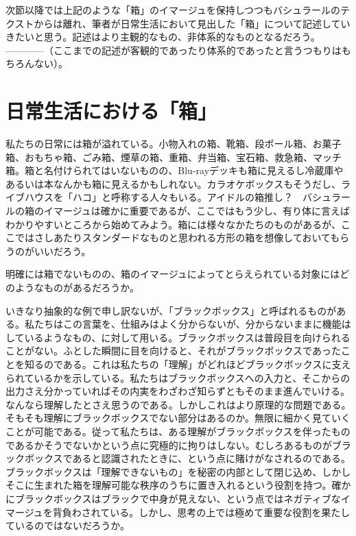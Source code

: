 \documentclass[b5j,twoside,twocolumn]{utarticle}
\begin{document}
次節以降では上記のような「箱」のイマージュを保持しつつもバシュラールのテクストからは離れ、筆者が日常生活において見出した「箱」について記述していきたいと思う。記述はより主観的なもの、非体系的なものとなるだろう。\tbaselineshift=2.5pt------------\tbaselineshift=3.4pt\hspace{-0.3zw}（ここまでの記述が客観的であったり体系的であったと言うつもりはもちろんない）。
\section{日常生活における「箱」}
私たちの日常には箱が溢れている。小物入れの箱、靴箱、段ボール箱、お菓子箱、おもちゃ箱、ごみ箱、煙草の箱、重箱、弁当箱、宝石箱、救急箱、マッチ箱。箱と名付けられてはいないものの、Blu-rayデッキも箱に見えるし冷蔵庫やあるいは本なんかも箱に見えるかもしれない。カラオケボックスもそうだし、ライブハウスを「ハコ」と呼称する人々もいる。アイドルの箱推し？　バシュラールの箱のイマージュは確かに重要であるが、ここではもう少し、有り体に言えばわかりやすいところから始めてみよう。箱には様々なかたちのものがあるが、ここではさしあたりスタンダードなものと思われる方形の箱を想像しておいてもらうのがいいだろう。


明確には箱でないものの、箱のイマージュによってとらえられている対象にはどのようなものがあるだろうか。


いきなり抽象的な例で申し訳ないが、「ブラックボックス」と呼ばれるものがある。私たちはこの言葉を、仕組みはよく分からないが、分からないままに機能はしているようなもの、に対して用いる。ブラックボックスは普段目を向けられることがない。ふとした瞬間に目を向けると、それがブラックボックスであったことを知るのである。これは私たちの「理解」がどれほどブラックボックスに支えられているかを示している。私たちはブラックボックスへの入力と、そこからの出力さえ分かっていればその内実をわざわざ知らずともそのまま進んでいける。なんなら理解したとさえ思うのである。しかしこれはより原理的な問題である。そもそも理解にブラックボックスでない部分はあるのか。無限に細かく見ていくことが可能である。従って私たちは、ある理解がブラックボックスを伴ったものであるかそうでないかという点に究極的に拘りはしない。むしろあるものがブラックボックスであると認識されたときに、という点に賭けがなされるのである。ブラックボックスは「理解できないもの」を秘密の内部として閉じ込め、しかしそこに生まれた箱を理解可能な秩序のうちに置き入れるという役割を持つ。確かにブラックボックスはブラックで中身が見えない、という点ではネガティブなイマージュを背負わされている。しかし、思考の上では極めて重要な役割を果たしているのではないだろうか。
\end{document}
